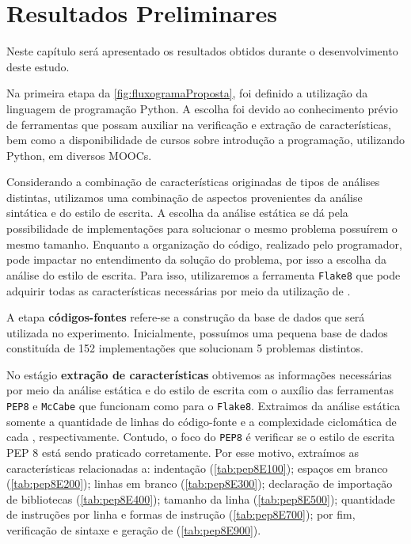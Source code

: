 \chapter{Resultados Preliminares}
\label{chap:Result}

	Neste capítulo será apresentado os resultados obtidos durante o desenvolvimento
	deste estudo.

	Na primeira etapa da \cref{fig:fluxogramaProposta}, foi definido a utilização
	da linguagem de programação Python. A escolha foi devido ao conhecimento prévio
	de ferramentas que possam auxiliar na verificação e extração de características,
	bem como a disponibilidade de cursos sobre introdução a programação, utilizando
	Python, em diversos MOOCs.
	
	Considerando a combinação de características originadas de tipos de análises
	distintas, utilizamos uma combinação de aspectos provenientes da análise
	sintática e do estilo de escrita. A escolha da análise estática se dá pela
	possibilidade de implementações para solucionar o mesmo problema possuírem
	o mesmo tamanho. Enquanto a organização do código, realizado pelo programador,
	pode impactar no entendimento da solução do problema, por isso a escolha da
	análise do estilo de escrita. Para isso, utilizaremos a ferramenta \texttt{Flake8}
	\cite{flake8} que pode adquirir todas as características necessárias por meio da
	utilização de .
	
	A etapa \textbf{códigos-fontes} refere-se a construção da base de dados que será
	utilizada no experimento. Inicialmente, possuímos uma pequena base de dados
	constituída de 152 implementações que solucionam 5 problemas distintos.
	
	No estágio \textbf{extração de características} obtivemos as informações necessárias
	por meio da análise estática e do estilo de escrita com o auxílio das ferramentas
	\texttt{PEP8} \cite{pep8} e \texttt{McCabe} \cite{mccabe} que funcionam como  para o
	\texttt{Flake8}. Extraimos da análise estática somente a quantidade de linhas
	do código-fonte e a complexidade ciclomática de cada ,
	respectivamente. Contudo, o foco do \texttt{PEP8} é verificar se o estilo de
	escrita PEP 8 \cite{van2001pep} está sendo praticado corretamente. Por esse
	motivo, extraímos as características relacionadas a: indentação (\cref{tab:pep8E100});
	espaços em branco (\cref{tab:pep8E200}); linhas em branco (\cref{tab:pep8E300});
	declaração de importação de bibliotecas (\cref{tab:pep8E400}); tamanho da linha
	(\cref{tab:pep8E500}); quantidade de instruções por linha e formas de instrução
	(\cref{tab:pep8E700}); por fim, verificação de sintaxe e geração de 
	(\cref{tab:pep8E900}).
	
